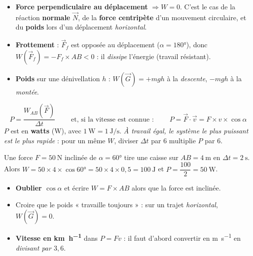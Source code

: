 \documentclass[11pt,a4paper]{article}
\newcommand{\vv}[1]{\vec{#1}}\newcommand{\ds}{\displaystyle}
\begin{document}
\begin{cle}
\begin{itemize}[leftmargin=1.5em,topsep=1pt,itemsep=1pt]
  \item \textbf{Force perpendiculaire au déplacement} $\Rightarrow W=0$. C'est le cas de la réaction
        \textbf{normale} $\vv N$, de la \textbf{force centripète} d'un mouvement circulaire, et du
        \textbf{poids} lors d'un déplacement \emph{horizontal}.
  \item \textbf{Frottement} : $\vv F_f$ est opposée au déplacement ($\alpha=\ang{180}$), donc
        $W(\vv F_f)=-F_f\times AB<0$ : il \emph{dissipe} l'énergie (travail résistant).
  \item \textbf{Poids} sur une dénivellation $h$ : $W(\vv G)=+mgh$ à la \emph{descente},
        $-mgh$ à la \emph{montée}.
\end{itemize}
\end{cle}

\begin{cle}
\[
\boxed{\;P=\dfrac{W_{AB}(\vv F)}{\Delta t}\;}\qquad\text{et, si la vitesse est connue :}\qquad
\boxed{\;P=\vv F\cdot\vv v=F\times v\times\cos\alpha\;}
\]
$P$ est en \textbf{watts} (\si{\watt}), avec $\SI{1}{\watt}=\SI{1}{\joule\per\second}$. \emph{À travail
égal, le système le plus puissant est le plus rapide} : pour un même $W$, diviser $\Delta t$ par $6$
multiplie $P$ par $6$.
\end{cle}

\begin{exemplebox}
Une force $F=\qty{50}{\newton}$ inclinée de $\alpha=\ang{60}$ tire une caisse sur $AB=\qty{4}{\metre}$
en $\Delta t=\qty{2}{\second}$. Alors $W=50\times 4\times\cos\ang{60}=50\times4\times0,5=\qty{100}{\joule}$
et $P=\dfrac{100}{2}=\qty{50}{\watt}$.
\end{exemplebox}

\begin{piege}
\begin{itemize}[leftmargin=1.5em,topsep=1pt,itemsep=1pt]
  \item \textbf{Oublier $\cos\alpha$} et écrire $W=F\times AB$ alors que la force est inclinée.
  \item Croire que le poids « travaille toujours » : sur un trajet \emph{horizontal}, $W(\vv G)=0$.
  \item \textbf{Vitesse en \si{\kilo\metre\per\hour}} dans $P=Fv$ : il faut d'abord convertir en
        \si{\metre\per\second} en \emph{divisant par $3,6$}.
\end{itemize}
\end{piege}
\end{document}
